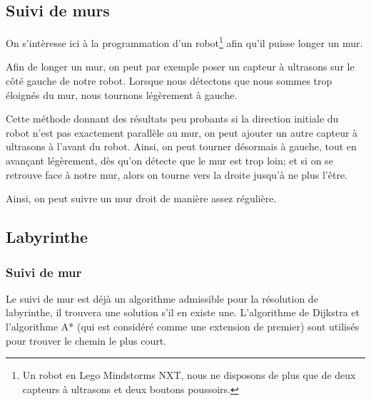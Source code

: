 \subsection{Suivi de murs}
  On s'intèresse ici à la programmation d'un robot\footnote{Un robot en Lego
  Mindstorms NXT, nous ne disposons de plus que de deux capteurs à ultrasons et
  deux boutons poussoirs.} afin qu'il puisse longer un mur.

  Afin de longer un mur, on peut par exemple poser un capteur à ultrasons sur
  le côté gauche de notre robot. Lorsque nous détectons que nous sommes trop
  éloignés du mur, nous tournons légèrement à gauche.

  Cette méthode donnant des résultats peu probants si la direction initiale du
  robot n'est pas exactement parallèle au mur, on peut ajouter un autre capteur
  à ultrasons à l'avant du robot. Ainsi, on peut tourner désormais à gauche,
  tout en avançant légèrement, dès qu'on détecte que le mur est trop loin; et
  si on se retrouve face à notre mur, alors on tourne vers la droite jusqu'à ne
  plus l'être.

  Ainsi, on peut suivre un mur droit de manière assez régulière.


\subsection{Labyrinthe}\label{sec:laby}
  \subsubsection{Suivi de mur}
    Le suivi de mur est déjà un algorithme admissible pour la résolution de
    labyrinthe, il trouvera une solution s'il en existe une. L'algorithme de
    Dijkstra et l'algorithme A* (qui est considéré comme une extension de
    premier) sont utilisés pour trouver le chemin le plus court.

